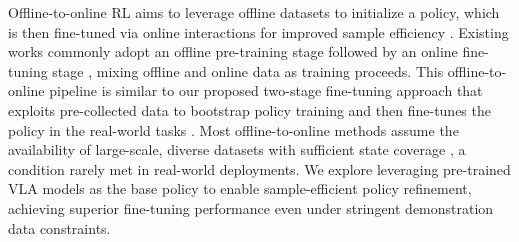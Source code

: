 Offline-to-online RL aims to leverage offline datasets to initialize a policy, which is then fine-tuned via online interactions for improved sample efficiency \cite{lee2022offline}. Existing works commonly adopt an offline pre-training stage followed by an online fine-tuning stage \cite{lee2022offline, agarwal2022reincarnating, rafailov2023moto, nakamoto2024cal}, mixing offline and online data as training proceeds. This offline-to-online pipeline is similar to our proposed two-stage fine-tuning approach that exploits pre-collected data to bootstrap policy training and then fine-tunes the policy in the real-world tasks \cite{tony2022offline}. Most offline-to-online methods assume the availability of large-scale, diverse datasets with sufficient state coverage \cite{rajeswaran2017learning, nair2018overcoming}, a condition rarely met in real-world deployments. We explore leveraging pre-trained VLA models as the base policy to enable sample-efficient policy refinement, achieving superior fine-tuning performance even under stringent demonstration data constraints.
